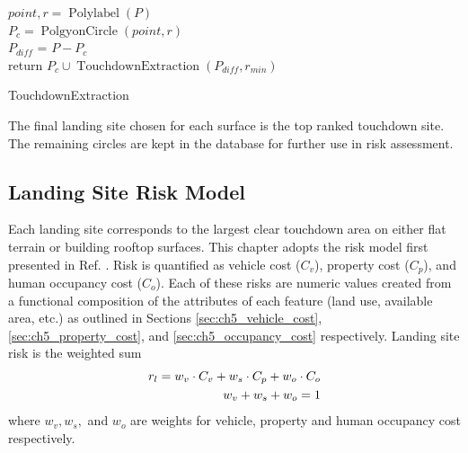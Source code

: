 \begin{algorithm}
    \SetStartEndCondition{ }{}{}%

    
    $point, r = \operatorname{Polylabel}(P)$ \\
    $P_{c} = \operatorname{PolgyonCircle}(point, r)$ \\
    $P_{diff}$ = $P - P_{c}$ \\
    return $P_{c} \cup \operatorname{TouchdownExtraction}(P_{diff}, r_{min})$
    \caption[Touchdown Extraction]{TouchdownExtraction}
    \label{alg:ch5_touchdown_extraction}
\end{algorithm}

The final landing site chosen for each surface is the top ranked touchdown site. The remaining circles are kept in the database for further use in risk assessment.

\subsection{Landing Site Risk Model}\label{sec:ch5_risk_model}

Each landing site corresponds to the largest clear touchdown area on either flat terrain or building rooftop surfaces. This chapter adopts the risk model first presented in Ref. \cite{castagno_comprehensive_2018}.  Risk is quantified as vehicle cost ($C_v$), property cost ($C_p$), and human occupancy cost ($C_o$). Each of these risks are numeric values created from a functional composition of the attributes of each feature (land use, available area, etc.) as outlined in Sections \ref{sec:ch5_vehicle_cost}, \ref{sec:ch5_property_cost}, and \ref{sec:ch5_occupancy_cost} respectively. Landing site risk is the weighted sum
\begin{align}\label{eq:ch5_landing_site_risk}
    r_l = w_v \cdot C_v + w_s \cdot C_p + w_o \cdot C_o \\
    w_v + w_s + w_o = 1 \notag
\end{align}
where $w_v, w_s,$ and $w_o$ are weights for vehicle, property and human occupancy cost respectively.

